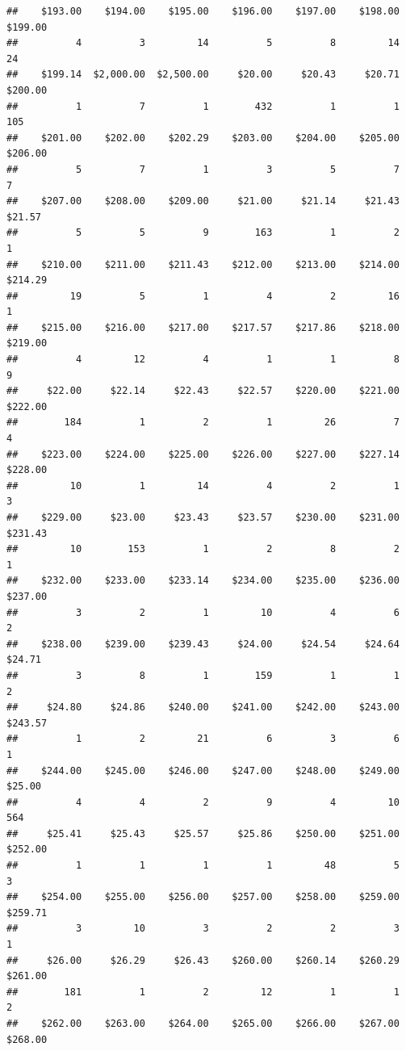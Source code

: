 \begin{verbatim}
##    $193.00    $194.00    $195.00    $196.00    $197.00    $198.00    $199.00 
##          4          3         14          5          8         14         24 
##    $199.14  $2,000.00  $2,500.00     $20.00     $20.43     $20.71    $200.00 
##          1          7          1        432          1          1        105 
##    $201.00    $202.00    $202.29    $203.00    $204.00    $205.00    $206.00 
##          5          7          1          3          5          7          7 
##    $207.00    $208.00    $209.00     $21.00     $21.14     $21.43     $21.57 
##          5          5          9        163          1          2          1 
##    $210.00    $211.00    $211.43    $212.00    $213.00    $214.00    $214.29 
##         19          5          1          4          2         16          1 
##    $215.00    $216.00    $217.00    $217.57    $217.86    $218.00    $219.00 
##          4         12          4          1          1          8          9 
##     $22.00     $22.14     $22.43     $22.57    $220.00    $221.00    $222.00 
##        184          1          2          1         26          7          4 
##    $223.00    $224.00    $225.00    $226.00    $227.00    $227.14    $228.00 
##         10          1         14          4          2          1          3 
##    $229.00     $23.00     $23.43     $23.57    $230.00    $231.00    $231.43 
##         10        153          1          2          8          2          1 
##    $232.00    $233.00    $233.14    $234.00    $235.00    $236.00    $237.00 
##          3          2          1         10          4          6          2 
##    $238.00    $239.00    $239.43     $24.00     $24.54     $24.64     $24.71 
##          3          8          1        159          1          1          2 
##     $24.80     $24.86    $240.00    $241.00    $242.00    $243.00    $243.57 
##          1          2         21          6          3          6          1 
##    $244.00    $245.00    $246.00    $247.00    $248.00    $249.00     $25.00 
##          4          4          2          9          4         10        564 
##     $25.41     $25.43     $25.57     $25.86    $250.00    $251.00    $252.00 
##          1          1          1          1         48          5          3 
##    $254.00    $255.00    $256.00    $257.00    $258.00    $259.00    $259.71 
##          3         10          3          2          2          3          1 
##     $26.00     $26.29     $26.43    $260.00    $260.14    $260.29    $261.00 
##        181          1          2         12          1          1          2 
##    $262.00    $263.00    $264.00    $265.00    $266.00    $267.00    $268.00 

\end{verbatim}
